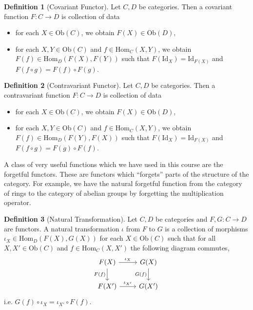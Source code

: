 \documentclass[]{article}
\theoremstyle{definition}
\theoremstyle{definition}
\newtheorem{definition}{Definition}[section]
\begin{document}
\begin{definition}[Covariant Functor]
  Let \(C, D\) be categories. Then a covariant function \(F : C \to D\) is 
  collection of data 
  \begin{itemize}
    \item for each \(X \in \text{Ob}(C)\), we obtain \(F(X) \in \text{Ob}(D)\),
    \item for each \(X, Y \in \text{Ob}(C)\) and \(f \in \text{Hom}_C(X, Y)\), we obtain 
      \(F(f) \in \text{Hom}_D(F(X), F(Y))\) such that \(F(\text{Id}_X) = \text{Id}_{F(X)}\) 
      and \(F(f \circ g) = F(f) \circ F(g)\).
  \end{itemize}
\end{definition}

\begin{definition}[Contravariant Functor]
  Let \(C, D\) be categories. Then a contravariant function \(F : C \to D\) is 
  collection of data 
  \begin{itemize}
    \item for each \(X \in \text{Ob}(C)\), we obtain \(F(X) \in \text{Ob}(D)\),
    \item for each \(X, Y \in \text{Ob}(C)\) and \(f \in \text{Hom}_C(X, Y)\), we obtain 
      \(F(f) \in \text{Hom}_D(F(Y), F(X))\) such that \(F(\text{Id}_X) = \text{Id}_{F(X)}\) 
      and \(F(f \circ g) = F(g) \circ F(f)\).
  \end{itemize}
\end{definition}

A class of very useful functions which we have used in this course are the forgetful 
functors. These are functors which ``forgets'' parts of the structure of the 
category. For example, we have the natural forgetful function from the 
category of rings to the category of abelian groups by forgetting the multiplication 
operator. 

\begin{definition}[Natural Transformation]
  Let \(C, D\) be categories and \(F, G : C \to D\) are functors. A natural 
  transformation \(\iota\) from \(F\) to \(G\) is a collection of morphisms  
  \(\iota_X \in \text{Hom}_D(F(X), G(X))\) for each \(X \in \text{Ob}(C)\) such that 
  for all \(X, X' \in \text{Ob}(C)\) and \(f \in \text{Hom}_C(X, X')\) the following 
  diagram commutes,
  \[\begin{tikzcd}
    F(X) \arrow[r, "\iota_X"] \arrow[swap, d, "F(f)"] & G(X) \arrow[swap, d, "G(f)"] \\
    F(X') \arrow[r, "\iota_{X'}"] & G(X')
    \end{tikzcd}\]
  i.e. \(G(f) \circ \iota_X = \iota_{X'} \circ F(f)\).
\end{definition}
\end{document}

